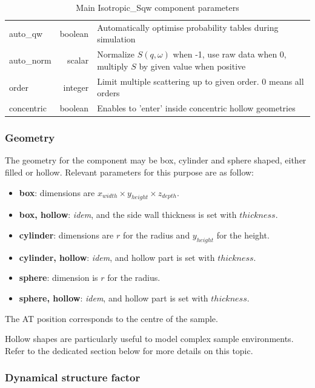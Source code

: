 \begin{table}
\begin{center}
{\begin{tabular}{|lr|p{}|}
    \hline
auto\_qw  & boolean & Automatically optimise probability tables during simulation  \\
auto\_norm& scalar  & Normalize $S(q,\omega)$ when -1, use raw data when 0, multiply $S$ by given value when positive \\
order     & integer & Limit multiple scattering up to given order. 0 means all orders  \\
concentric& boolean & Enables to 'enter' inside concentric hollow geometries  \\
    \hline
    \end{tabular}
    \caption{Main Isotropic\_Sqw component parameters}
    \label{t:sqw-param}
  }
  \end{center}
\end{table}

\subsubsection{Geometry}

The geometry for the component may be box, cylinder and sphere shaped, either filled or hollow. Relevant parameters for this purpose are as follow:
\begin{itemize}
\item {\bf box}: dimensions are $x_{width} \times y_{height} \times z_{depth}$.
\item {\bf box, hollow}: \emph{idem}, and the side wall thickness is set with $thickness$.
\item {\bf cylinder}: dimensions are $r$ for the radius and $y_{height}$ for the height.
\item {\bf cylinder, hollow}: \emph{idem}, and hollow part is set with $thickness$.
\item {\bf sphere}: dimension is $r$ for the radius.
\item {\bf sphere, hollow}: \emph{idem}, and hollow part is set with $thickness$.
\end{itemize}
The AT position corresponds to the centre of the sample.

Hollow shapes are particularly useful to model complex sample environments. Refer to the dedicated section below for more details on this topic.

\subsubsection{Dynamical structure factor}

